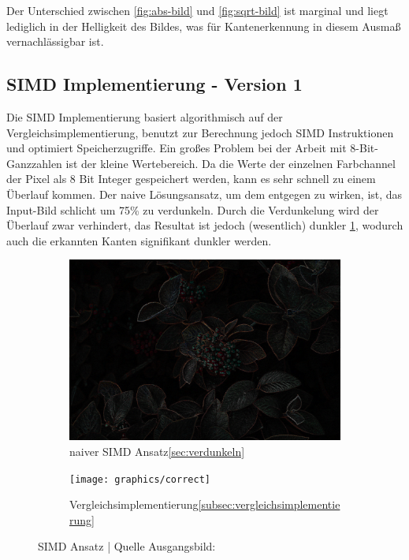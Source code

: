 \documentclass[course=erap]{aspdoc}
\begin{document}
Der Unterschied zwischen \ref{fig:abs-bild} und \ref{fig:sqrt-bild} ist marginal und liegt lediglich in der Helligkeit des Bildes, was für Kantenerkennung in diesem Ausmaß vernachlässigbar ist.
\subsection{SIMD Implementierung - Version 1}
\label{subsec:simd-implementierung}
Die SIMD Implementierung basiert algorithmisch auf der Vergleichsimplementierung, benutzt zur Berechnung jedoch SIMD Instruktionen und optimiert Speicherzugriffe.
Ein großes Problem bei der Arbeit mit 8-Bit-Ganzzahlen ist der kleine Wertebereich.
Da die Werte der einzelnen Farbchannel der Pixel als 8 Bit Integer gespeichert werden, kann es sehr schnell zu einem Überlauf kommen.
Der naive Lösungsansatz, um dem entgegen zu wirken, ist, das Input-Bild schlicht um 75\% zu verdunkeln. \label{sec:verdunkeln}
Durch die Verdunkelung wird der Überlauf zwar verhindert, das Resultat ist jedoch (wesentlich) dunkler {\ref{fig:dark}}, wodurch auch die erkannten Kanten signifikant dunkler werden.
\begin{figure}[H]
    \begin{subfigure}{.5\columnwidth}
        \centering
        \includegraphics[width=\columnwidth]{graphics/dark}
        \caption{naiver SIMD Ansatz\ref{sec:verdunkeln}}
        \label{fig:dark}
    \end{subfigure}
    \begin{subfigure}{.5\columnwidth}
        \centering
        \texttt{[image: graphics/correct]}
        \caption{Vergleichsimplementierung\ref{subsec:vergleichsimplementierung}}
        \label{fig:correct}
    \end{subfigure}
    \caption{SIMD Ansatz | Quelle Ausgangsbild:\cite{flowerpicture}}
\end{figure}
\end{document}
